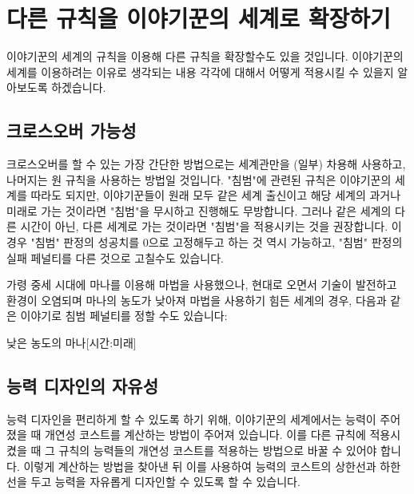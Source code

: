 \documentclass{report}
\begin{document}
	\section*{다른 규칙을 이야기꾼의 세계로 확장하기}
	이야기꾼의 세계의 규칙을 이용해 다른 규칙을 확장할수도 있을 것입니다. 이야기꾼의 세계를 이용하려는 이유로 생각되는 내용 각각에 대해서 어떻게 적용시킬 수 있을지 알아보도록 하겠습니다.
	
	\subsection*{크로스오버 가능성}
	크로스오버를 할 수 있는 가장 간단한 방법으로는 세계관만을 (일부) 차용해 사용하고, 나머지는 원 규칙을 사용하는 방법일 것입니다. "침범"에 관련된 규칙은 이야기꾼의 세계를 따라도 되지만, 이야기꾼들이 원래 모두 같은 세계 출신이고 해당 세계의 과거나 미래로 가는 것이라면 "침범"을 무시하고 진행해도 무방합니다. 그러나 같은 세계의 다른 시간이 아닌, 다른 세계로 가는 것이라면 "침범"을 적용시키는 것을 권장합니다. 이 경우 "침범" 판정의 성공치를 0으로 고정해두고 하는 것 역시 가능하고, "침범" 판정의 실패 페널티를 다른 것으로 고칠수도 있습니다.
	
	가령 중세 시대에 마나를 이용해 마법을 사용했으나, 현대로 오면서 기술이 발전하고 환경이 오염되며 마나의 농도가 낮아져 마법을 사용하기 힘든 세계의 경우, 다음과 같은 이야기로 침범 페널티를 정할 수도 있습니다:
	
	\begin{story}{낮은 농도의 마나}{[시간:미래]}
	\end{story}
	
	\subsection*{능력 디자인의 자유성}
	능력 디자인을 편리하게 할 수 있도록 하기 위해, 이야기꾼의 세계에서는 능력이 주어졌을 때 개연성 코스트를 계산하는 방법이 주어져 있습니다. 이를 다른 규칙에 적용시켰을 때 그 규칙의 능력들의 개연성 코스트를 적용하는 방법으로 바꿀 수 있어야 합니다. 이렇게 계산하는 방법을 찾아낸 뒤 이를 사용하여 능력의 코스트의 상한선과 하한선을 두고 능력을 자유롭게 디자인할 수 있도록 할 수 있습니다.
	
\end{document}
